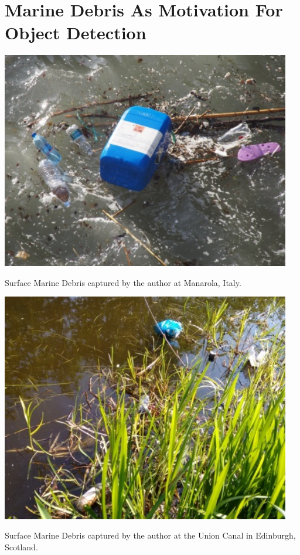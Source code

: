 \chapter[Marine Debris As Motivation For Object Detection]{Marine Debris As \newline Motivation For Object Detection}
\label{chapter:motivation}

\begin{marginfigure}
    \centering
    \includegraphics[width = 0.95\textwidth]{chapters/images/natural-garbage/manarola-debris-cut.jpg}
    \caption[Surface Marine Debris at Manarola, Italy.]{Surface Marine Debris captured by the author at Manarola, Italy.}
    \label{md:manarola-surface}
\end{marginfigure}

\begin{marginfigure}
    \centering
    \includegraphics[width = 0.95\textwidth]{chapters/images/natural-garbage/union-canal-surface-garbage.jpg}
    \caption[Surface Marine Debris at the Union Canal in Edinburgh, Scotland]{Surface Marine Debris captured by the author at the Union Canal in Edinburgh, Scotland.}
    \label{md:edinburgh-surface}
\end{marginfigure}

